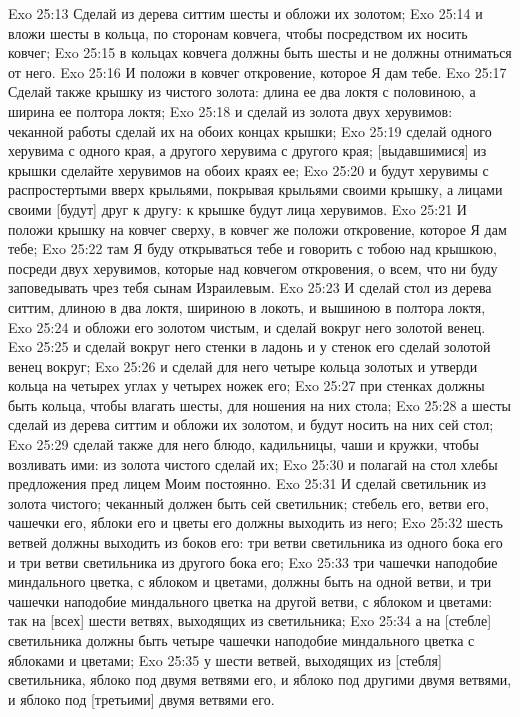 Exo 25:13  Сделай из дерева ситтим шесты и обложи их золотом;
Exo 25:14  и вложи шесты в кольца, по сторонам ковчега, чтобы посредством их носить ковчег;
Exo 25:15  в кольцах ковчега должны быть шесты и не должны отниматься от него.
Exo 25:16  И положи в ковчег откровение, которое Я дам тебе.
Exo 25:17  Сделай также крышку из чистого золота: длина ее два локтя с половиною, а ширина ее полтора локтя;
Exo 25:18  и сделай из золота двух херувимов: чеканной работы сделай их на обоих концах крышки;
Exo 25:19  сделай одного херувима с одного края, а другого херувима с другого края; [выдавшимися] из крышки сделайте херувимов на обоих краях ее;
Exo 25:20  и будут херувимы с распростертыми вверх крыльями, покрывая крыльями своими крышку, а лицами своими [будут] друг к другу: к крышке будут лица херувимов.
Exo 25:21  И положи крышку на ковчег сверху, в ковчег же положи откровение, которое Я дам тебе;
Exo 25:22  там Я буду открываться тебе и говорить с тобою над крышкою, посреди двух херувимов, которые над ковчегом откровения, о всем, что ни буду заповедывать чрез тебя сынам Израилевым.
Exo 25:23  И сделай стол из дерева ситтим, длиною в два локтя, шириною в локоть, и вышиною в полтора локтя,
Exo 25:24  и обложи его золотом чистым, и сделай вокруг него золотой венец.
Exo 25:25  и сделай вокруг него стенки в ладонь и у стенок его сделай золотой венец вокруг;
Exo 25:26  и сделай для него четыре кольца золотых и утверди кольца на четырех углах у четырех ножек его;
Exo 25:27  при стенках должны быть кольца, чтобы влагать шесты, для ношения на них стола;
Exo 25:28  а шесты сделай из дерева ситтим и обложи их золотом, и будут носить на них сей стол;
Exo 25:29  сделай также для него блюдо, кадильницы, чаши и кружки, чтобы возливать ими: из золота чистого сделай их;
Exo 25:30  и полагай на стол хлебы предложения пред лицем Моим постоянно.
Exo 25:31  И сделай светильник из золота чистого; чеканный должен быть сей светильник; стебель его, ветви его, чашечки его, яблоки его и цветы его должны выходить из него;
Exo 25:32  шесть ветвей должны выходить из боков его: три ветви светильника из одного бока его и три ветви светильника из другого бока его;
Exo 25:33  три чашечки наподобие миндального цветка, с яблоком и цветами, должны быть на одной ветви, и три чашечки наподобие миндального цветка на другой ветви, с яблоком и цветами: так на [всех] шести ветвях, выходящих из светильника;
Exo 25:34  а на [стебле] светильника должны быть четыре чашечки наподобие миндального цветка с яблоками и цветами;
Exo 25:35  у шести ветвей, выходящих из [стебля] светильника, яблоко под двумя ветвями его, и яблоко под другими двумя ветвями, и яблоко под [третьими] двумя ветвями его.
